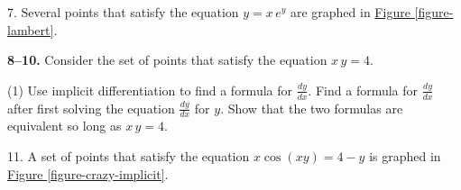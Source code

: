 \documentclass[10pt,oneside,]{book}
\theoremstyle{plain}
\theoremstyle{definition}
\numberwithin{equation}{section}
\newcounter{figstack}
\newcounter{figindex}
\newlength\fight
\newcommand\pushValignCaptionBottom[5][b]{%
\stepcounter{figstack}%
\expandafter\def\csname %
figalign\romannumeral\value{figstack}\endcsname{#1}%
\expandafter\def\csname %
figtype\romannumeral\value{figstack}\endcsname{#2}%
\expandafter\def\csname %
figwd\romannumeral\value{figstack}\endcsname{#3}%
\expandafter\def\csname %
figcontent\romannumeral\value{figstack}\endcsname{#4}%
\expandafter\def\csname %
figcap\romannumeral\value{figstack}\endcsname{#5}%
\setbox0=\hbox{%
\begin{#2}{#3}#4\end{#2}}%
\ifdim\dimexpr\ht0+\dp0\relax>\fight\global\setlength{\fight}{%
\dimexpr\ht0+\dp0\relax}\fi%
}
\newcommand\popValignCaptionBottom{%
\setcounter{figindex}{0}%
\hfill%
\whiledo{\value{figindex}<\value{figstack}}{%
\stepcounter{figindex}%
\def\tmp{\csname figwd\romannumeral\value{figindex}\endcsname}%
\begin{\csname figtype\romannumeral\value{figindex}\endcsname}[t]{\tmp}%
\centering%
\stackinset{c}{}%
{\csname figalign\romannumeral\value{figindex}\endcsname}{}%
{\csname figcontent\romannumeral\value{figindex}\endcsname}%
{\rule{0pt}{\fight}}\par%
\csname figcap\romannumeral\value{figindex}\endcsname%
\end{\csname figtype\romannumeral\value{figindex}\endcsname}%
\hfill%
}%
\setcounter{figstack}{0}%
\setlength{\fight}{0pt}%
\hfill%
}
\newcommand{\fe}[2]{#1\mathopen{}\left(#2\right)\mathclose{}}
\newcommand{\lz}[2]{\frac{d#1}{d#2}}
\begin{document}
\begin{exerciselist}
\item[7.]\hypertarget{exercise-528}{\null}Several points that satisfy the equation \(y=x\,e^y\) are graphed in \hyperref[figure-lambert]{Figure \ref{figure-lambert}}.%
\par\smallskip
\textbf{8--10. }\hypertarget{exercisegroup-105}{\null}Consider the set of points that satisfy the equation \(x\,y=4\).%
\par
\begin{exercisegroup}(1)
\exercise[8.]\hypertarget{exercise-529}{\null}Use implicit differentiation to find a formula for \(\lz{y}{x}\).%
\exercise[9.]\hypertarget{exercise-530}{\null}Find a formula for \(\lz{y}{x}\) after first solving the equation \(\lz{y}{x}\) for \(y\).%
\exercise[10.]\hypertarget{exercise-531}{\null}Show that the two formulas are equivalent so long as \(x\,y=4\).%
\end{exercisegroup}
\par\smallskip\noindent
\item[11.]\hypertarget{exercise-532}{\null}A set of points that satisfy the equation \(x\fe{\cos}{xy}=4-y\) is graphed in \hyperref[figure-crazy-implicit]{Figure \ref{figure-crazy-implicit}}.%
\end{exerciselist}
\end{document}
